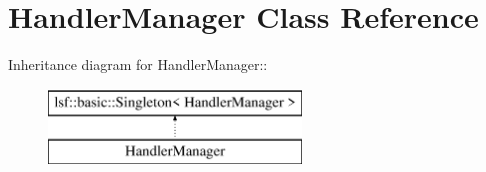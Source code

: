 \hypertarget{classHandlerManager}{
\section{HandlerManager Class Reference}
\label{classHandlerManager}
}
Inheritance diagram for HandlerManager::\begin{figure}[H]
\begin{center}
\leavevmode
\includegraphics[height=2cm]{classHandlerManager}
\end{center}
\end{figure}
